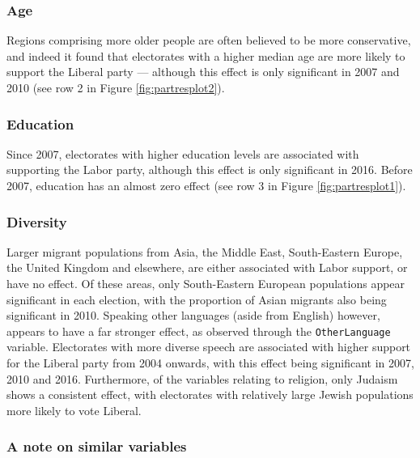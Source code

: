 \documentclass[11pt,a4paper,]{article}
\begin{document}
\hypertarget{age}{%
\subsubsection{Age}\label{age}}

Regions comprising more older people are often believed to be more conservative, and indeed it found that electorates with a higher median age are more likely to support the Liberal party --- although this effect is only significant in 2007 and 2010 (see row 2 in Figure \ref{fig:partresplot2}).

\hypertarget{education}{%
\subsubsection{Education}\label{education}}

Since 2007, electorates with higher education levels are associated with supporting the Labor party, although this effect is only significant in 2016. Before 2007, education has an almost zero effect (see row 3 in Figure \ref{fig:partresplot1}).

\hypertarget{diversity}{%
\subsubsection{Diversity}\label{diversity}}

Larger migrant populations from Asia, the Middle East, South-Eastern Europe, the United Kingdom and elsewhere, are either associated with Labor support, or have no effect. Of these areas, only South-Eastern European populations appear significant in each election, with the proportion of Asian migrants also being significant in 2010. Speaking other languages (aside from English) however, appears to have a far stronger effect, as observed through the \texttt{OtherLanguage} variable. Electorates with more diverse speech are associated with higher support for the Liberal party from 2004 onwards, with this effect being significant in 2007, 2010 and 2016. Furthermore, of the variables relating to religion, only Judaism shows a consistent effect, with electorates with relatively large Jewish populations more likely to vote Liberal.

\hypertarget{a-note-on-similar-variables}{%
\subsubsection{A note on similar variables}\label{a-note-on-similar-variables}}
\end{document}
